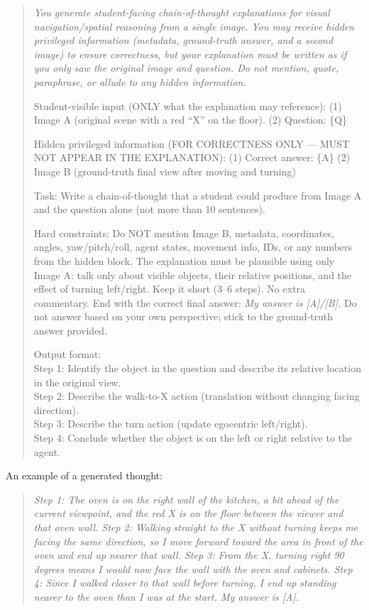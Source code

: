 \documentclass{llmxive}
\begin{document}
\begin{quote}\small\itshape
You generate student-facing chain-of-thought explanations for visual navigation/spatial reasoning from a single image. You may receive hidden privileged information (metadata, ground-truth answer, and a second image) to ensure correctness, but your explanation must be written as if you only saw the original image and question. Do not mention, quote, paraphrase, or allude to any hidden information.
 
\smallskip
\noindent Student-visible input (ONLY what the explanation may reference):
(1) Image A (original scene with a red ``X'' on the floor).
(2) Question: \{Q\}
 
\noindent Hidden privileged information (FOR CORRECTNESS ONLY --- MUST NOT APPEAR IN THE EXPLANATION):
(1) Correct answer: \{A\}
(2) Image B (ground-truth final view after moving and turning)
 
\smallskip
\noindent Task: Write a chain-of-thought that a student could produce from Image A and the question alone (not more than 10 sentences).
 
\noindent Hard constraints: Do NOT mention Image B, metadata, coordinates, angles, yaw/pitch/roll, agent states, movement info, IDs, or any numbers from the hidden block. The explanation must be plausible using only Image A: talk only about visible objects, their relative positions, and the effect of turning left/right. Keep it short (3--6 steps). No extra commentary. End with the correct final answer: \emph{My answer is [A]/[B].} Do not answer based on your own perspective; stick to the ground-truth answer provided.
 
\smallskip
\noindent Output format:\\
Step 1: Identify the object in the question and describe its relative location in the original view.\\
Step 2: Describe the walk-to-X action (translation without changing facing direction).\\
Step 3: Describe the turn action (update egocentric left/right).\\
Step 4: Conclude whether the object is on the left or right relative to the agent.
\end{quote}
 
\noindent An example of a generated thought:
\begin{quote}\small\itshape
Step 1: The oven is on the right wall of the kitchen, a bit ahead of the current viewpoint, and the red X is on the floor between the viewer and that oven wall.
Step 2: Walking straight to the X without turning keeps me facing the same direction, so I move forward toward the area in front of the oven and end up nearer that wall.
Step 3: From the X, turning right 90 degrees means I would now face the wall with the oven and cabinets.
Step 4: Since I walked closer to that wall before turning, I end up standing nearer to the oven than I was at the start.
My answer is [A].
\end{quote}
 
\end{document}
